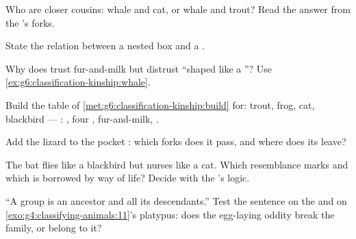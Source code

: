 \begin{exercise}[$\star$]\label{exo:g6:classification-kinship:5}
Who are closer cousins: whale and cat, or whale and trout?
Read the answer from the 's forks.
\end{exercise}

\begin{exercise}[$\star$]\label{exo:g6:classification-kinship:6}
State the relation between a nested box and a  .
\end{exercise}

\begin{exercise}[$\star\star$]\label{exo:g6:classification-kinship:7}
Why does  trust fur-and-milk but distrust
``shaped like a ''? Use
\cref{ex:g6:classification-kinship:whale}.
\end{exercise}

\begin{exercise}[$\star\star$]\label{exo:g6:classification-kinship:8}
Build the  table of
\cref{met:g6:classification-kinship:build} for: trout,
frog, cat, blackbird --- : , four ,
fur-and-milk, .
\end{exercise}

\begin{exercise}[$\star\star$]\label{exo:g6:classification-kinship:9}
Add the lizard to the pocket : which forks does it
pass, and where does its  leave?
\end{exercise}

\begin{exercise}[$\star\star$]\label{exo:g6:classification-kinship:10}
The bat flies like a blackbird but nurses like a cat.
Which resemblance marks  and which is borrowed by
way of life? Decide with the 's logic.
\end{exercise}

\begin{exercise}[$\star\star$]\label{exo:g6:classification-kinship:11}
``A group is an ancestor and all its descendants.'' Test
the sentence on the  and on
\cref{exo:g4:classifying-animals:11}'s platypus: does the
egg-laying oddity break the family, or belong to it?
\end{exercise}

